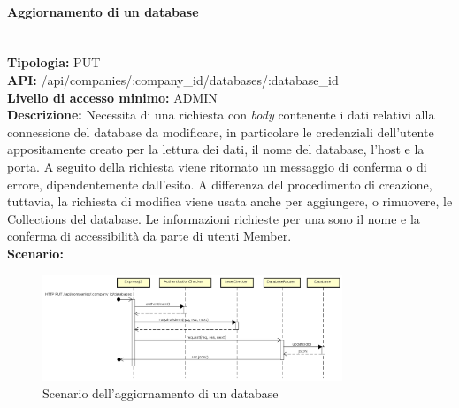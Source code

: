 \paragraph{Aggiornamento di un database}\mbox{}\\
\textbf{Tipologia:} PUT \\
\textbf{API:} /api/companies/:company\_id/databases/:database\_id \\
\textbf{Livello di accesso minimo:} ADMIN \\
\textbf{Descrizione:} Necessita di una richiesta con \textit{body} contenente i dati relativi alla connessione del database da modificare, in particolare le credenziali dell'utente appositamente creato per la lettura dei dati, il nome del database, l'host e la porta. A seguito della richiesta viene ritornato un messaggio di conferma o di errore, dipendentemente dall'esito. A differenza del procedimento di creazione, tuttavia, la richiesta di modifica viene usata anche per aggiungere, o rimuovere, le Collections del database. Le informazioni richieste per una  sono il nome e la conferma di accessibilità da parte di utenti Member. \\
\textbf{Scenario:}
\begin{figure}[H]
\centering
\includegraphics[width=0.8\textwidth]{res/sections/backend/sequence/(PUT)database.png}
\caption{Scenario dell'aggiornamento di un database}
\end{figure}

\newpage
